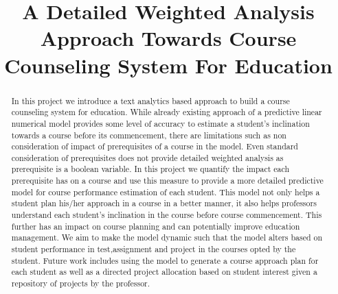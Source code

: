 \documentclass[conference]{IEEEtran}
\begin{document}
	\title{A Detailed Weighted Analysis Approach Towards Course Counseling System For Education}
    	\author{
		}
	\maketitle
	\begin{abstract}
In this project we introduce a text analytics based approach to build a course counseling system for education. While already existing approach of a predictive linear numerical model provides some level of accuracy to estimate a student's inclination towards a course before its commencement, there are limitations such as non consideration of impact of prerequisites of a course in the model. Even standard consideration of prerequisites does not provide detailed weighted analysis as prerequisite is a boolean variable. In this project we quantify the impact each prerequisite has on a course and use this measure to provide a more detailed predictive model for course performance estimation of each student. This model not only helps a student plan his/her approach in a course in a better manner, it also helps professors understand each student's inclination in the course before course commencement. This further has an impact on course planning and can potentially improve education management. We aim to make the model dynamic such that the model alters based on student performance in test,assignment and project in the courses opted by the student. Future work includes using the model to generate a course approach plan for each student as well as a directed project allocation based on student interest given a repository of projects by the professor.
	\end{abstract}
    
\end{document}
